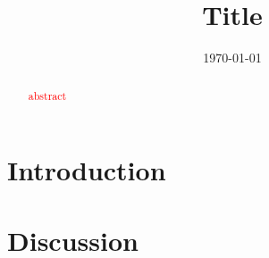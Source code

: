 \documentclass{uva-inf-article}
\title{Title}
\date{\today}
\newcommand{\ad}[1]{\textcolor{red}{#1}}
\begin{document}
\maketitle



\begin{abstract}
 \ad{abstract}
\end{abstract}

\newpage

\section{Introduction}





\section{Discussion}





\end{document}
